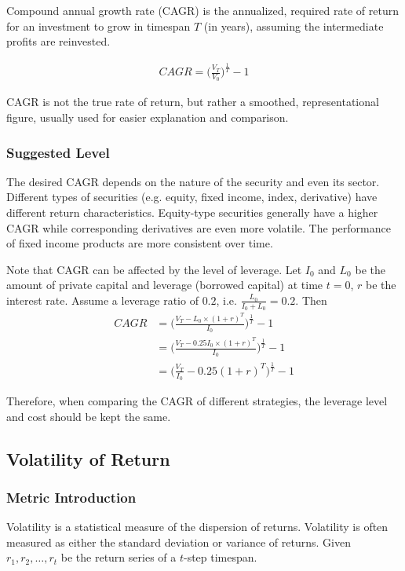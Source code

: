 \documentclass[12pt]{article}
\begin{document}
Compound annual growth rate (CAGR) is the annualized, required rate of return for an investment to grow in timespan \(T\) (in years), assuming the intermediate profits are reinvested.

\begin{align*}
  CAGR = \bigg(\frac{V_T}{V_0} \bigg)^{\frac{1}{T}}-1
\end{align*}

CAGR is not the true rate of return, but rather a smoothed, representational figure, usually used for easier explanation and comparison.

\subsubsection*{Suggested Level}

The desired CAGR depends on the nature of the security and even its sector. Different types of securities (e.g. equity, fixed income, index, derivative) have different return characteristics. Equity-type securities generally have a higher CAGR while corresponding derivatives are even more volatile. The performance of fixed income products are more consistent over time.

Note that CAGR can be affected by the level of leverage. Let $I_0$ and $L_0$ be the amount of private capital and leverage (borrowed capital) at time $t=0$, $r$ be the interest rate. Assume a leverage ratio of $0.2$, i.e. $\frac{L_0}{I_0+L_0} = 0.2$. Then
\begin{align*}
  CAGR &= \bigg(\frac{V_T-L_0\times (1+r)^T}{I_0} \bigg)^{\frac{1}{T}}-1 \\
       &= \bigg(\frac{V_T-0.25I_0\times (1+r)^T}{I_0} \bigg)^{\frac{1}{T}}-1 \\
       &= \bigg(\frac{V_T}{I_0}-0.25(1+r)^T \bigg)^{\frac{1}{T}}-1
\end{align*}

Therefore, when comparing the CAGR of different strategies, the leverage level and cost should be kept the same.

\subsection{Volatility of Return}

\subsubsection*{Metric Introduction}

Volatility is a statistical measure of the dispersion of returns. Volatility is often measured as either the standard deviation or variance of returns. Given $r_1, r_2, \dots , r_t$ be the return series of a $t$-step timespan.
\end{document}
